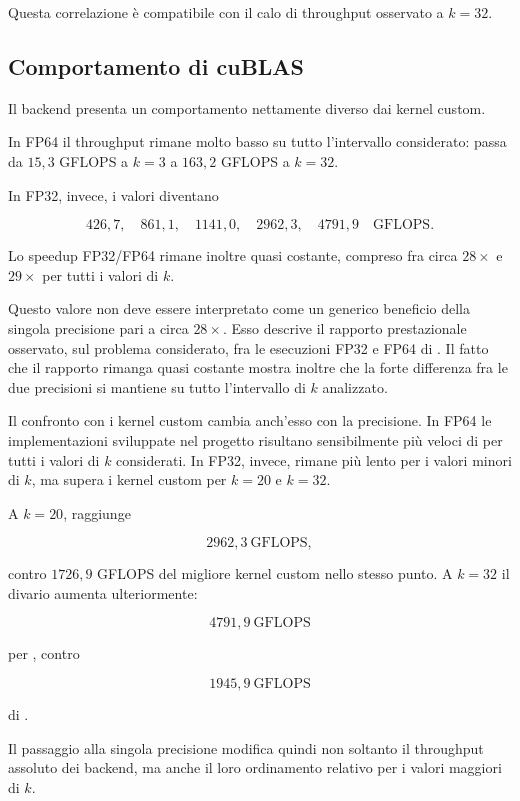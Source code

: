 Questa correlazione è compatibile con il calo di throughput osservato a
$k=32$.


\subsection{Comportamento di cuBLAS}

Il backend  presenta un comportamento nettamente diverso
dai kernel custom.

In FP64 il throughput rimane molto basso su tutto l'intervallo considerato:
passa da $15{,}3$ GFLOPS a $k=3$ a $163{,}2$ GFLOPS a $k=32$.

In FP32, invece, i valori diventano

\[
426{,}7,\quad
861{,}1,\quad
1141{,}0,\quad
2962{,}3,\quad
4791{,}9
\quad\text{GFLOPS}.
\]

Lo speedup FP32/FP64 rimane inoltre quasi costante, compreso fra circa
$28\times$ e $29\times$ per tutti i valori di $k$.

Questo valore non deve essere interpretato come un generico beneficio della
singola precisione pari a circa $28\times$. Esso descrive il rapporto
prestazionale osservato, sul problema considerato, fra le esecuzioni FP32 e
FP64 di . Il fatto che il rapporto rimanga quasi costante
mostra inoltre che la forte differenza fra le due precisioni si mantiene su
tutto l'intervallo di $k$ analizzato.

Il confronto con i kernel custom cambia anch'esso con la precisione. In FP64
le implementazioni sviluppate nel progetto risultano sensibilmente più veloci
di  per tutti i valori di $k$ considerati. In FP32,
invece,  rimane più lento per i valori minori di $k$, ma
supera i kernel custom per $k=20$ e $k=32$.

A $k=20$,  raggiunge

\[
2962{,}3\ \text{GFLOPS},
\]

contro $1726{,}9$ GFLOPS del migliore kernel custom nello stesso punto. A
$k=32$ il divario aumenta ulteriormente:

\[
4791{,}9\ \text{GFLOPS}
\]

per , contro

\[
1945{,}9\ \text{GFLOPS}
\]

di .

Il passaggio alla singola precisione modifica quindi non soltanto il
throughput assoluto dei backend, ma anche il loro ordinamento relativo per i
valori maggiori di $k$.


